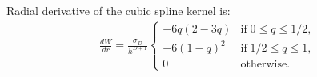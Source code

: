 \documentclass[notes.tex]{subfiles}
\begin{document}
Radial derivative of the cubic spline kernel is:
\begin{align}
 \frac{dW}{dr} = \frac{\sigma_D}{h^{D+1}} 
  \begin{cases}
   -6q(2 - 3q)  & \text{if} \; 0 \leq q \leq 1/2, \\
   -6(1 - q)^2  & \text{if} \; 1/2 \leq q \leq 1, \\
    0           & \text{otherwise}.
\end{cases}
\end{align}

\end{document}
